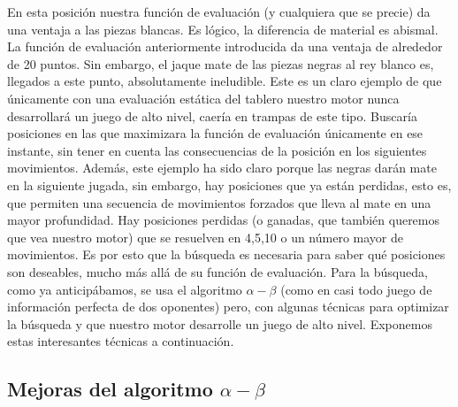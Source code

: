 \documentclass[letterpaper,12pt]{article}
\begin{document}
\setlength{\parskip}{\baselineskip}
En esta posición nuestra función de evaluación (y cualquiera que se precie) da una ventaja
a las piezas blancas. Es lógico, la diferencia de material es abismal. La función de 
evaluación anteriormente introducida da una ventaja de alrededor de 20 puntos. Sin embargo,
el jaque mate de las piezas negras al rey blanco es, llegados a este punto, absolutamente 
ineludible. Este es un claro ejemplo de que únicamente con una evaluación estática del 
tablero nuestro motor nunca desarrollará un juego de alto nivel, caería en trampas de este 
tipo. Buscaría posiciones en las que maximizara la función de evaluación únicamente en ese 
instante, sin tener en cuenta las consecuencias de la posición en los siguientes movimientos.
Además, este ejemplo ha sido claro porque las negras darán mate en la siguiente jugada,
sin embargo, hay posiciones que ya están perdidas, esto es, que permiten una secuencia
de movimientos forzados que lleva al mate en una mayor profundidad. Hay posiciones perdidas
(o ganadas, que también queremos que vea nuestro motor) que se resuelven en 4,5,10 o un 
número mayor de movimientos. Es por esto que la búsqueda es necesaria para saber qué 
posiciones son deseables, mucho más allá de su función de evaluación. Para la búsqueda,
como ya anticipábamos, se usa el algoritmo $\alpha-\beta$ (como en casi todo juego de 
información perfecta de dos oponentes) pero, con algunas técnicas para optimizar la búsqueda
y que nuestro motor desarrolle un juego de alto nivel. Exponemos estas interesantes técnicas 
a continuación.


\subsection{Mejoras del algoritmo $\alpha-\beta$}
\end{document}
